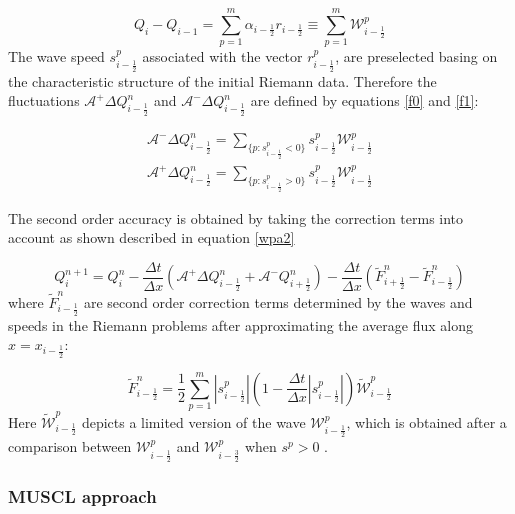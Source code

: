 \documentclass[10pt,a4paper]{article}
\begin{document}
\begin{equation}
	Q_{i} -  Q_{i-1} = \sum_{p=1}^{m}  \alpha_{i-\frac{1}{2}} r_{i-\frac{1}{2}} \equiv \sum_{p=1}^{m} \mathcal{W}_{i-\frac{1}{2}}^{p}
	\label{wpa19}
\end{equation}
The wave speed $s_{i-\frac{1}{2}}^{p}$ associated with the vector $r_{i-\frac{1}{2}}^{p}$, are preselected basing on the characteristic structure of the initial Riemann data. Therefore the fluctuations $\mathcal{A^{+}}\Delta Q_{i-\frac{1}{2}}^{n}$  and $\mathcal{A^{-}}\Delta Q_{i-\frac{1}{2}}^{n} $ are defined by equations \eqref{f0} and \eqref{f1}:

\begin{eqnarray}
	\mathcal{A^{-}}\Delta Q_{i-\frac{1}{2}}^{n} = \sum_{\{ p:s_{i-\frac{1}{2}}^{p}<0\}} s_{i-\frac{1}{2}}^{p} \mathcal{W}_{i-\frac{1}{2}}^{p}
	\label{f0}\\
	\mathcal{A^{+}}\Delta Q_{i-\frac{1}{2}}^{n} =\sum_{\{ p:s_{i-\frac{1}{2}}^{p}>0\}} s_{i-\frac{1}{2}}^{p} \mathcal{W}_{i-\frac{1}{2}}^{p}
	\label{f1}
\end{eqnarray}

	The second order accuracy is obtained by taking the correction terms into account as shown described in equation \eqref{wpa2} 

\begin{equation}
	Q_{i}^{n+1} =  Q_{i}^{n} - \frac{\Delta t}{\Delta x}(\mathcal{A^{+}}\Delta 	Q_{i-\frac{1}{2}}^{n} + \mathcal{A^{-}}Q_{i+\frac{1}{2}}^{n}) -  \frac{\Delta t}{\Delta x} (\tilde{F}_{i+\frac{1}{2}}^{n} - \tilde{F}_{i-\frac{1}{2}}^{n} )
	\label{wpa2}
\end{equation}
where $\tilde{F}_{i-\frac{1}{2}}^{n} $ are second order correction terms determined by the waves and speeds in the Riemann problems after approximating the average flux along  $x = x_{i - \frac{1}{2}}$:

\begin{equation}
	\tilde{F}_{i-\frac{1}{2}}^{n} = \frac{1}{2} \sum_{p=1}^{m}  |s_{i- \frac{1}{2}}^{p}| \left( 1 - \frac{\Delta t}{\Delta x} |s_{i- \frac{1}{2}}^{p}|\right) \tilde{\mathcal{W}}_{i-\frac{1}{2}}^{p} 
	\label{wpa13}
\end{equation}
Here $\tilde{\mathcal{W}}_{i-\frac{1}{2}}^{p} $ depicts a limited version of the wave $\mathcal{W}_{i-\frac{1}{2}}^{p} $, which is obtained after a comparison between $\mathcal{W}_{i-\frac{1}{2}}^{p} $ and $\mathcal{W}_{i-\frac{3}{2}}^{p} $ when $s^{p} >0$ \cite{le:1997}.

	\subsubsection{MUSCL approach}
\end{document}
